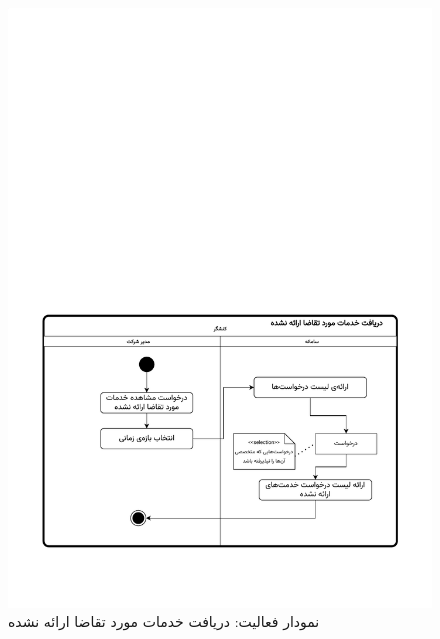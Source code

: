 \begin{figure}[ht!]
	\centering
	\includegraphics[scale=0.8, page=1]{figs/OOD-activity-reqnot.pdf}
	\caption{نمودار فعالیت: دریافت خدمات مورد تقاضا ارائه نشده}
\end{figure}
\FloatBarrier
\newpage


